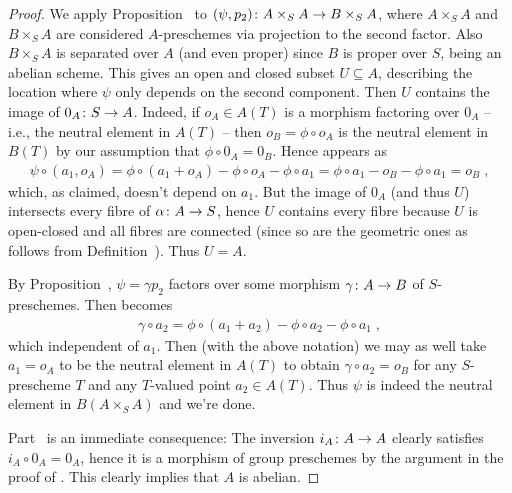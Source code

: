 \documentclass[a4paper,parskip=half,numbers=enddot, DIV=12]{scrreprt}
\begin{document}
\begin{proof}
	We apply Proposition~ to $(\psi,p_2)\colon A\times_SA\morphism B\times_SA$, where $A\times_SA$ and $B\times_SA$ are considered $A$-preschemes via projection to the second factor. Also $B\times_SA$ is separated over $A$ (and even proper) since $B$ is proper over $S$, being an abelian scheme. This gives an open and closed subset $U\subseteq A$, describing the location where $\psi$ only depends on the second component. Then $U$ contains the image of $0_A\colon S\morphism A$. Indeed, if $o_A\in A(T)$ is a morphism factoring over $0_A$ -- i.e., the neutral element in $A(T)$ -- then $o_B=\phi\circ o_A$ is the neutral element in $B(T)$ by our assumption that $\phi\circ 0_A=0_B$. Hence  appears as
	\begin{align*}
		\psi\circ(a_1,o_A)=\phi\circ (a_1+o_A)-\phi\circ o_A-\phi\circ a_1=\phi\circ a_1 -o_B-\phi\circ a_1=o_B\;,
	\end{align*}
	which, as claimed, doesn't depend on $a_1$. But the image of $0_A$ (and thus $U$) intersects every fibre of $\alpha\colon A\morphism S$, hence $U$ contains every fibre because $U$ is open-closed and all fibres are connected
	(since so are the geometric ones as follows from Definition~). Thus $U=A$.
	
	By Proposition~, $\psi=\gamma p_2$ factors over some morphism $\gamma\colon A\morphism B$ of $S$-preschemes. Then  becomes
	\begin{align*}
		\gamma\circ a_2=\phi\circ(a_1+a_2)-\phi\circ a_2-\phi\circ a_1\;,
	\end{align*}
	which independent of $a_1$. Then (with the above notation) we may as well take $a_1=o_A$ to be the neutral element in $A(T)$ to obtain $\gamma\circ a_2=o_B$ for any $S$-prescheme $T$ and any $T$-valued point $a_2\in A(T)$. Thus $\psi$ is indeed the neutral element in $B(A\times_SA)$ and we're done.
	
	Part~ is an immediate consequence: The inversion $i_A\colon A\morphism A$ clearly satisfies $i_A\circ 0_A=0_A$, hence it is a morphism of group preschemes by the argument in the proof of . This clearly implies that $A$ is abelian.
	

\end{proof}
\end{document}
